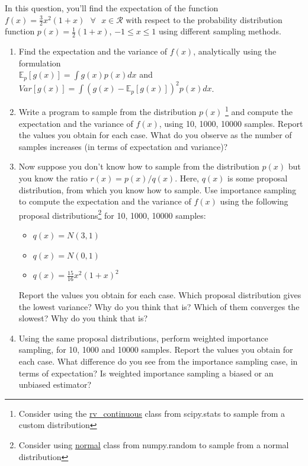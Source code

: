 \documentclass[12pt]{article}
\begin{document}
In this question, you'll find the expectation of the function $f(x) = \frac{3}{2}x^2(1 + x) \text{ } \forall\text{ } x \in \mathcal{R}$  with respect to the probability distribution function $p(x) = \frac{1}{2}(1 + x)$, $-1 \le x \le 1$ using different sampling methods. 

\begin{enumerate}
    \item Find the expectation and the variance of $f(x)$, analytically using the formulation \\ $\mathbb{E}_p[g(x)] = \int g(x)p(x)dx $ and $Var[g(x)] = \int (g(x) - \mathbb{E}_p[g(x)])^2p(x)dx $.
    \item Write a program to sample from the distribution $p(x)$ \footnote{Consider using the \href{https://docs.scipy.org/doc/scipy/reference/generated/scipy.stats.rv_continuous.html}{\underline{rv\_continuous}} class from scipy.stats to sample from a custom distribution} and compute the expectation and the variance of $f(x)$, using 10, 1000, 10000 samples. Report the values you obtain for each case. What do you observe as the number of samples increases (in terms of expectation and variance)?
    \item Now suppose you don't know how to sample from the distribution $p(x)$ but you know the ratio $r(x) = p(x)/q(x)$. Here, $q(x)$ is some proposal distribution, from which you know how to sample. Use importance sampling to compute the expectation and the variance of $f(x)$ using the following proposal distributions\footnote{Consider using \href{https://docs.scipy.org/doc/numpy-1.15.0/reference/generated/numpy.random.normal.html}{\underline{normal}} class from numpy.random to sample from a normal distribution} for 10, 1000, 10000 samples:
    \begin{itemize}
        \item $q(x) = N(3,1)$
        \item $q(x) = N(0,1)$
        \item $q(x) = \frac{15}{16}x^2(1+x)^2$
    \end{itemize}
    Report the values you obtain for each case. Which proposal distribution gives the lowest variance? Why do you think that is? Which of them converges the slowest? Why do you think that is?
    \item Using the same proposal distributions, perform weighted importance sampling, for 10, 1000 and 10000 samples. Report the values you obtain for each case. What difference do you see from the importance sampling case, in terms of expectation? Is weighted importance sampling a biased or an unbiased estimator?
\end{enumerate}
\end{document}

